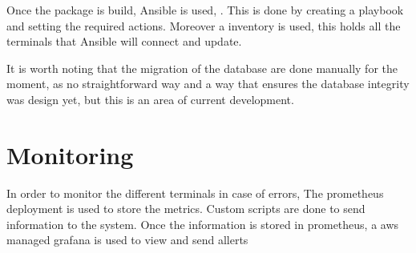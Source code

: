 Once the package is build, Ansible is used, . This is done by creating a playbook and setting the required actions. Moreover a inventory is used, this holds all the terminals that Ansible will  connect and update.


It is worth noting that the migration of the database are done manually for the moment, as no straightforward way and a way that ensures the database integrity was design yet, but this is an area of current development.


\section{Monitoring}

In order to monitor the different terminals in case of errors, The prometheus deployment is used to store the metrics. Custom scripts are done to send information to the system. Once the information is stored in prometheus, a aws managed grafana is used to view and send allerts




